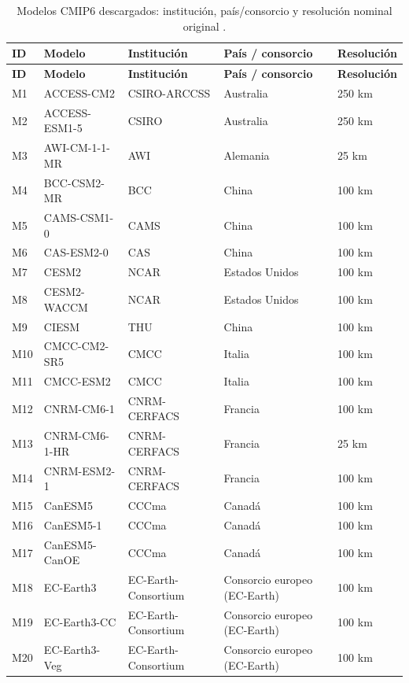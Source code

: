 \documentclass[11pt,a4paper]{article}
\begin{document}
\begin{longtable}{@{}L{0.9cm}L{3.2cm}L{3.0cm}L{\dimexpr\textwidth-0.9cm-3.2cm-3.0cm-2.3cm-8\tabcolsep\relax}L{2.3cm}@{}}
\caption[Modelos CMIP6 descargados, con instituci\'on, pa\'is y resoluci\'on nominal.]{Modelos CMIP6 descargados: instituci\'on, pa\'is/consorcio y resoluci\'on nominal original
.}
\label{tab:modelos} \\
\toprule
\textbf{ID} & \textbf{Modelo} & \textbf{Instituci\'on} & \textbf{Pa\'is / consorcio} & \textbf{Resoluci\'on} \\
\midrule
\endfirsthead
\toprule
\textbf{ID} & \textbf{Modelo} & \textbf{Instituci\'on} & \textbf{Pa\'is / consorcio} & \textbf{Resoluci\'on} \\
\midrule
\endhead
\bottomrule
\endfoot
M1  & ACCESS-CM2 & CSIRO-ARCCSS & Australia & 250 km \\
M2  & ACCESS-ESM1-5 & CSIRO & Australia & 250 km \\
M3  & AWI-CM-1-1-MR & AWI & Alemania & 25 km \\
M4  & BCC-CSM2-MR & BCC & China & 100 km \\
M5  & CAMS-CSM1-0 & CAMS & China & 100 km \\
M6  & CAS-ESM2-0 & CAS & China & 100 km \\
M7  & CESM2 & NCAR & Estados Unidos & 100 km \\
M8  & CESM2-WACCM & NCAR & Estados Unidos & 100 km \\
M9  & CIESM & THU & China & 100 km \\
M10 & CMCC-CM2-SR5 & CMCC & Italia & 100 km \\
M11 & CMCC-ESM2 & CMCC & Italia & 100 km \\
M12 & CNRM-CM6-1 & CNRM-CERFACS & Francia & 100 km \\
M13 & CNRM-CM6-1-HR & CNRM-CERFACS & Francia & 25 km \\
M14 & CNRM-ESM2-1 & CNRM-CERFACS & Francia & 100 km \\
M15 & CanESM5 & CCCma & Canad\'a & 100 km \\
M16 & CanESM5-1 & CCCma & Canad\'a & 100 km \\
M17 & CanESM5-CanOE & CCCma & Canad\'a & 100 km \\
M18 & EC-Earth3 & EC-Earth-Consortium & Consorcio europeo (EC-Earth) & 100 km \\
M19 & EC-Earth3-CC & EC-Earth-Consortium & Consorcio europeo (EC-Earth) & 100 km \\
M20 & EC-Earth3-Veg & EC-Earth-Consortium & Consorcio europeo (EC-Earth) & 100 km \\

\end{longtable}
\end{document}
